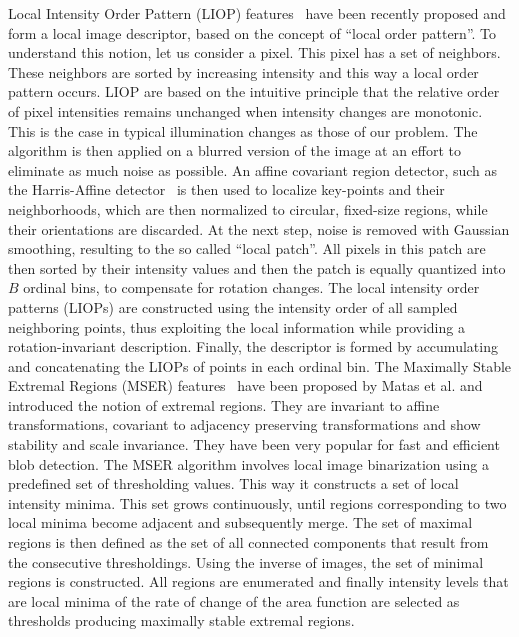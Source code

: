 Local Intensity Order Pattern (LIOP) features~\cite{wang2011local} have been recently proposed and form a local image descriptor, based on the concept of ``local order pattern''. To understand this notion, let us consider a pixel. This pixel has a set of neighbors. These neighbors are sorted by increasing intensity and this way a local order pattern occurs. LIOP are based on the intuitive principle that the relative order of pixel intensities remains unchanged when intensity changes are monotonic. This is the case in typical illumination changes as those of our problem. The algorithm is then applied on a blurred version of the image at an effort to eliminate as much noise as possible. An affine covariant region detector, such as the Harris-Affine detector~\cite{harris1988combined} is then used to localize key-points and their neighborhoods, which are then normalized to circular, fixed-size regions, while their orientations are discarded. At the next step, noise is removed with Gaussian smoothing, resulting to the so called ``local patch''. All pixels in this patch are then sorted by their intensity values and then the patch is equally quantized into $B$ ordinal bins, to compensate for rotation changes. The local intensity order patterns (LIOPs) are constructed using the intensity order of all sampled neighboring points, thus exploiting the local information while providing a rotation-invariant description. Finally, the descriptor is formed by accumulating and concatenating the LIOPs of points in each ordinal bin.
The Maximally Stable Extremal Regions (MSER) features~\cite{matas2004robust} have been proposed by Matas et al. and introduced the notion of extremal regions. They are invariant to affine 
transformations, covariant
to adjacency preserving
transformations and show stability and scale invariance. They
have been very popular for fast and efficient blob detection.
The MSER algorithm involves local image binarization using
a predefined set of thresholding values. This way it constructs
a set of local intensity minima. This set grows continuously,
until regions corresponding to two local minima become
adjacent and subsequently merge. The set of maximal regions
is then defined as the set of all connected components that
result from the consecutive thresholdings. Using the inverse of
images, the set of minimal regions is constructed. All regions
are enumerated and finally intensity levels that are local
minima of the rate of change of the area function are selected
as thresholds producing maximally stable extremal regions.

